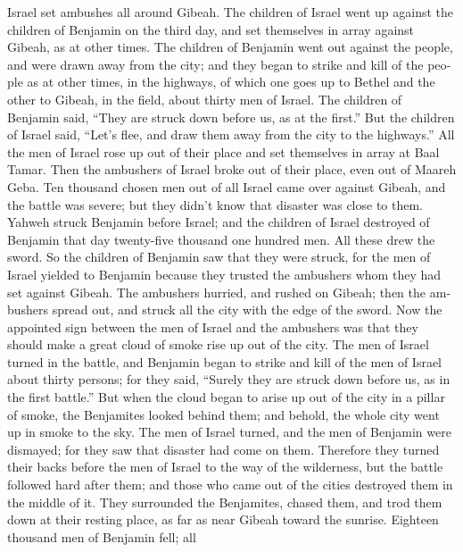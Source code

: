\begin{paracol}{2}
\begin{otherlanguage}{english}
 Israel set ambushes all around Gibeah. 
The children of Israel went up against the children of Benjamin on the
third day, and set themselves in array against Gibeah, as at other
times.  The children of Benjamin went out against the
people, and were drawn away from the city; and they began to strike and
kill of the people as at other times, in the highways, of which one goes
up to Bethel and the other to Gibeah, in the field, about thirty men of
Israel.  The children of Benjamin said, ``They are struck
down before us, as at the first.'' But the children of Israel said,
``Let's flee, and draw them away from the city to the highways.''
 All the men of Israel rose up out of their place and set
themselves in array at Baal Tamar. Then the ambushers of Israel broke
out of their place, even out of Maareh Geba.  Ten
thousand chosen men out of all Israel came over against Gibeah, and the
battle was severe; but they didn't know that disaster was close to them.
 Yahweh struck Benjamin before Israel; and the children
of Israel destroyed of Benjamin that day twenty-five thousand one
hundred men. All these drew the sword.  So the children
of Benjamin saw that they were struck, for the men of Israel yielded to
Benjamin because they trusted the ambushers whom they had set against
Gibeah.  The ambushers hurried, and rushed on Gibeah;
then the ambushers spread out, and struck all the city with the edge of
the sword.  Now the appointed sign between the men of
Israel and the ambushers was that they should make a great cloud of
smoke rise up out of the city.  The men of Israel turned
in the battle, and Benjamin began to strike and kill of the men of
Israel about thirty persons; for they said, ``Surely they are struck
down before us, as in the first battle.''  But when the
cloud began to arise up out of the city in a pillar of smoke, the
Benjamites looked behind them; and behold, the whole city went up in
smoke to the sky.  The men of Israel turned, and the men
of Benjamin were dismayed; for they saw that disaster had come on them.
 Therefore they turned their backs before the men of
Israel to the way of the wilderness, but the battle followed hard after
them; and those who came out of the cities destroyed them in the middle
of it.  They surrounded the Benjamites, chased them, and
trod them down at their resting place, as far as near Gibeah toward the
sunrise.  Eighteen thousand men of Benjamin fell; all

\end{otherlanguage}
\end{paracol}
